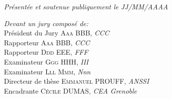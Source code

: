 \documentclass[
11pt, %
english, %
singlespacing, %
headsepline, %
]{MastersDoctoralThesis} %
\theoremstyle{remark}
\begin{document}
\begin{titlepage}
\begin{center}
\vspace*{.04\textheight}
\emph{Pr\'esent\'ee et soutenue publiquement le JJ/MM/AAAA}
\end{center}


\begin{minipage}[t]{\textwidth}
\emph{Devant un jury compos\'e de:}\\
Pr\'esident du Jury \hfill \textsc{Aaa BBB, } \textit{CCC}\\
Rapporteur \hfill \textsc{Aaa BBB, } \textit{CCC}\\
Rapporteur \hfill \textsc{Ddd EEE, } \textit{FFF}\\
Examinateur \hfill \textsc{Ggg HHH, } \textit{III}\\
Examinateur \hfill \textsc{Lll Mmm, } \textit{Nnn}\\
Directeur de th\`ese \hfill \textsc{Emmanuel PROUFF,} \textit{ANSSI}\\
Encadrante \hfill \textsc{C\'ecile DUMAS,} \textit{CEA Grenoble}

\end{minipage}
% 
%
% 

\end{titlepage}

\end{document}
